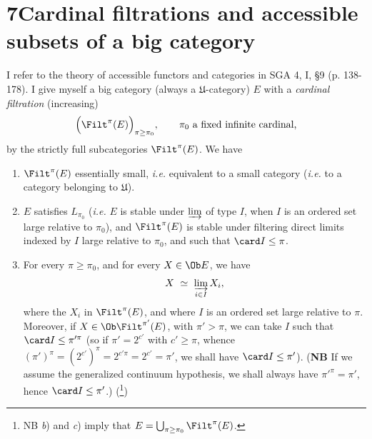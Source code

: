 
\section*{7\quad Cardinal filtrations and accessible subsets of a big category}

I refer to the theory of accessible functors and categories in SGA 4, I, §9 (p. 138-178). I give myself a big category (always a $\mathfrak{U}$-category) $E$ with a \textit{cardinal filtration} (increasing)
\[
\Bigl(\Filt^{\pi}(E)\Bigr)_{\pi \geq \pi_0}, \qquad \pi_0 \text{ a fixed infinite cardinal,}
\]
by the strictly full subcategories $\Filt^{\pi}(E)$. We have 

\begin{enumerate}
\item[\textit{a})] $\Filt^{\pi}(E)$ essentially small, \textit{i.e.} equivalent to a small category (\textit{i.e.} to a category belonging to $\mathfrak{U}$).
\item[\textit{b})] $E$ satisfies $L_{\pi_0}$ (\textit{i.e.} $E$ is stable under $\varinjlim$ of type $I$, when $I$ is an ordered set large relative to $\pi_0$), and $\Filt^{\pi}(E)$ is stable under filtering direct limits indexed by $I$ large relative to $\pi_0$, and such that $\card I \leq \pi$.
\item[\textit{c})] For every $\pi \geq \pi_0$, and for every $X \in \Ob E$, we have
\[
X \ \simeq\ \varinjlim_{i \in I} X_i,
\]
where the $X_i$ in $\Filt^{\pi}(E)$, and where $I$ is an ordered set large relative to $\pi$. Moreover, if $X \in \Ob \Filt^{\pi'}(E)$, with $\pi' > \pi$, we can take $I$ such that $\card I \leq \pi'^{\pi}$ (so if $\pi' = 2^{c'}$ with $c' \geq \pi$, whence $(\pi')^{\pi} = (2^{c'})^{\pi} = 2^{c'\pi} = 2^{c'} = \pi'$, we shall have $\card I \leq \pi'$). (\textbf{NB} If we assume the generalized continuum hypothesis, we shall always have $\pi'^{\pi} = \pi'$, hence $\card I \leq \pi'$.) (\footnote[39]{NB \textit{b}) and \textit{c}) imply that $E = \bigcup_{\pi \geq \pi_0} \Filt^{\pi}(E)$.})
\end{enumerate}




